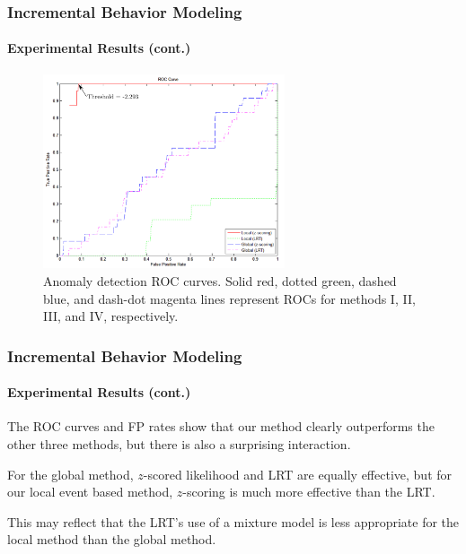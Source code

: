 
\begin{frame}
    \frametitle{Incremental Behavior Modeling}
    \framesubtitle{Experimental Results (cont.)}
    
    \begin{figure}
        \centering
        \includegraphics[width=2.8in]{figures/roc-ours-vs-global-results}
        \caption{Anomaly detection ROC
            curves. Solid red, dotted green, dashed blue, and dash-dot magenta
            lines represent ROCs for methods I, II, III, and IV,
            respectively.}
        \label{fig:roc-ours-vs-global-results}
    \end{figure}

\end{frame}


\begin{frame}
    \frametitle{Incremental Behavior Modeling}
    \framesubtitle{Experimental Results (cont.)}
    
    The ROC curves and FP rates show that our method clearly outperforms
    the other three methods, but there is also a surprising interaction.

    \bigskip

    For the global method, $z$-scored likelihood and LRT are equally
    effective, but for our local event based method, $z$-scoring is much
    more effective than the LRT.  
    
    \bigskip
    
    This may reflect that the LRT's use of a mixture model is less 
    appropriate for the local method than the global method.
    
\end{frame}


